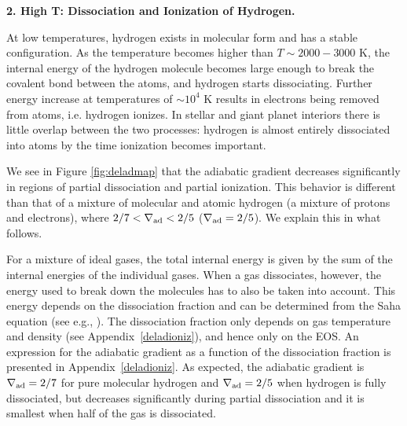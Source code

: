 \documentclass[apj]{emulateapj}
\newcommand{\delad}{\nabla_{\rm ad}}
\newcommand{\App}[1]{Appendix~\ref{#1}}
\begin{document}
\vspace{0.2in}

\textbf{2. High T: Dissociation and Ionization of Hydrogen.}

At low temperatures, hydrogen exists in molecular form and has a stable configuration. As the temperature becomes higher than $T \sim 2000-3000$ K, the internal energy of the hydrogen molecule becomes large enough to break the covalent bond between the atoms, and hydrogen starts dissociating. Further energy increase at temperatures of $\sim 10^4$ K results in electrons being removed from atoms, i.e. hydrogen ionizes. In stellar and giant planet interiors there is little overlap between the two processes: hydrogen is almost entirely dissociated into atoms by the time ionization becomes important. 

We see in Figure \ref{fig:deladmap} that the adiabatic gradient decreases significantly in regions of partial dissociation and partial ionization. This behavior is different than that of a mixture of molecular and atomic hydrogen (a mixture of protons and electrons), where $2/7<\delad<2/5$ ($\delad=2/5$). We  explain this in what follows. %


For a mixture of ideal gases, the total internal energy is given by the sum of the internal energies of the individual gases. When a gas dissociates, however, the energy used to break down the molecules has to also be taken into account. This energy depends on the dissociation fraction and can be determined from the Saha equation (see e.g., \citealt{kippenhahn90}). The dissociation fraction only depends on gas temperature and density (see \App{deladioniz}), and hence only on the EOS. 
An expression for the adiabatic gradient as a function of the dissociation fraction is presented in \App{deladioniz}. As expected, the adiabatic gradient is $\delad=2/7$ for pure molecular hydrogen and $\delad=2/5$ when hydrogen is fully dissociated, but decreases significantly during partial dissociation and it is smallest when half of the gas is dissociated. 
\end{document}
